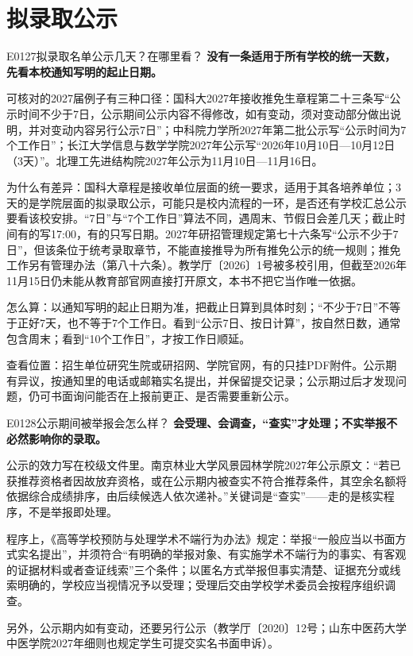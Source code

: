 \section{拟录取公示}
\begin{qa}{E0127}{拟录取名单公示几天？在哪里看？}
\textbf{没有一条适用于所有学校的统一天数，先看本校通知写明的起止日期。}

可核对的2027届例子有三种口径：国科大2027年接收推免生章程第二十三条写“公示时间不少于7日，公示期间公示内容不得修改，如有变动，须对变动部分做出说明，并对变动内容另行公示7日”；中科院力学所2027年第二批公示写“公示时间为7个工作日”；长江大学信息与数学学院2027年公示写“2026年10月10日—10月12日（3天）”。北理工先进结构院2027年公示为11月10日—11月16日。

为什么有差异：国科大章程是接收单位层面的统一要求，适用于其各培养单位；3天的是学院层面的拟录取公示，可能只是校内流程的一环，是否还有学校汇总公示要看该校安排。“7日”与“7个工作日”算法不同，遇周末、节假日会差几天；截止时间有的写17:00，有的只写日期。2027年研招管理规定第七十六条写“公示不少于7日”，但该条位于统考录取章节，不能直接推导为所有推免公示的统一规则；推免工作另有管理办法（第八十六条）。教学厅〔2026〕1号被多校引用，但截至2026年11月15日仍未能从教育部官网直接打开原文，本书不把它当作唯一依据。

怎么算：以通知写明的起止日期为准，把截止日算到具体时刻；“不少于7日”不等于正好7天，也不等于7个工作日。看到“公示7日、按日计算”，按自然日数，通常包含周末；看到“10个工作日”，才按工作日顺延。

查看位置：招生单位研究生院或研招网、学院官网，有的只挂PDF附件。公示期有异议，按通知里的电话或邮箱实名提出，并保留提交记录；公示期过后才发现问题，仍可书面询问能否在上报前更正、是否需要重新公示。
\end{qa}

\begin{qa}{E0128}{公示期间被举报会怎么样？}
\textbf{会受理、会调查，“查实”才处理；不实举报不必然影响你的录取。}

公示的效力写在校级文件里。南京林业大学风景园林学院2027年公示原文：“若已获推荐资格者因故放弃资格，或在公示期内被查实不符合推荐条件，其空余名额将依据综合成绩排序，由后续候选人依次递补。”关键词是“查实”——走的是核实程序，不是举报即处理。

程序上，《高等学校预防与处理学术不端行为办法》规定：举报“一般应当以书面方式实名提出”，并须符合“有明确的举报对象、有实施学术不端行为的事实、有客观的证据材料或者查证线索”三个条件；以匿名方式举报但事实清楚、证据充分或线索明确的，学校应当视情况予以受理；受理后交由学校学术委员会按程序组织调查。

另外，公示期内如有变动，还要另行公示（教学厅〔2020〕12号；山东中医药大学中医学院2027年细则也规定学生可提交实名书面申诉）。
\end{qa}

